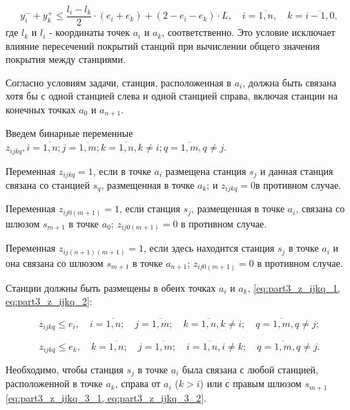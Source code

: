 \begin{equation}
  \label{eq:part3_yi_4}
  y_i^- + y_k^+  \leq \frac{l_i-l_k}{2} \cdot (e_i + e_k) + (2 - e_i - e_k) \cdot L, \quad i = \overline{1,n}, \quad k = \overline{i-1,0},
\end{equation}
где $ l_k $ и $ l_i $ - координаты точек $ a_i $ и $ a_k $, соответственно. Это условие исключает влияние пересечений покрытий станций при вычислении общего значения покрытия между станциями.

Согласно условиям задачи, станция, расположенная в $ a_i $, должна быть связана хотя бы с одной станцией слева и одной станцией справа, включая станции на конечных точках $ a_0 $ и $a_{n + 1}$. 

Введем бинарные переменные $z_{ijkq}, i = \overline{1,n}; j= \overline{1,m}; k=\overline{1,n},  k \neq i; q= \overline{1,m}, q \neq j$.

Переменная $ z_ {ijkq} = 1$, если в точке $ a_i $ размещена станция $ s_j $ и данная станция связана со станцией $ s_q $, размещенная в точке $ a_k $; и $ z_ {ijkq} = 0 $в противном случае.

Переменная $ z_{ij0(m + 1)} = 1$, если станция $ s_j $, размещенная в точке $ a_i $, связана со шлюзом $ s_{m + 1} $ в точке $ a_0 $; $ z_{ij0 (m + 1)} = 0 $ в противном случае.
 
Переменная $ z_{ij(n + 1)(m + 1)} = 1 $, если здесь находится станция $ s_j $ в точке $ a_i $ и она связана со шлюзом $ s_{m + 1} $ в точке $ a_{n + 1} $; $ z_{ij0(m + 1)} = 0 $  в противном случае.

Станции должны быть размещены в обеих точках $ a_i $ и $ a_k $, \cref{eq:part3_z_ijkq_1, eq:part3_z_ijkq_2}:

\begin{equation}
  \label{eq:part3_z_ijkq_1}
  z_{ijkq} \leq e_i , \quad i = \overline{1, n}; \quad j = \overline{1, m}; \quad k = \overline{1,n}, k \neq i; \quad q = \overline{1,m}, q \neq j;
\end{equation}


\begin{equation}
  \label{eq:part3_z_ijkq_2}
  z_{ijkq} \leq e_k , \quad k = \overline{1, n}; \quad j = \overline{1, m}; \quad i = \overline{1,n}, i \neq k; \quad q = \overline{1,m}, q \neq j.
\end{equation}


Необходимо, чтобы станция $ s_j $ в точке $ a_i $ была связана с  любой станцией, расположенной в точке $ a_k $, справа от $ a_i $ ($ k> i $) или с правым шлюзом $ s_{m + 1} $ \cref{eq:part3_z_ijkq_3_1, eq:part3_z_ijkq_3_2}. 

